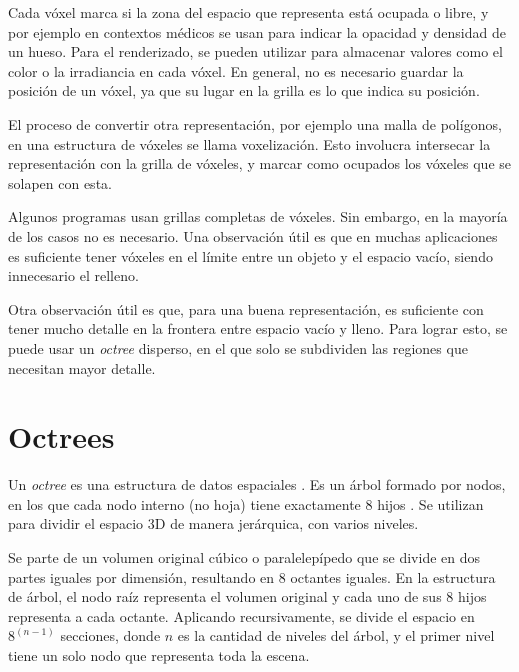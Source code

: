 

Cada vóxel marca si la zona del espacio que representa está ocupada o libre, y por ejemplo en contextos médicos se usan para indicar la opacidad y densidad de un hueso.
Para el renderizado, se pueden utilizar para almacenar valores como el color o la irradiancia en cada vóxel.
En general, no es necesario guardar la posición de un vóxel, ya que su lugar en la grilla es lo que indica su posición.

El proceso de convertir otra representación, por ejemplo una malla de polígonos, en una estructura de vóxeles se llama voxelización.
Esto involucra intersecar la representación con la grilla de vóxeles, y marcar como ocupados los vóxeles que se solapen con esta.

Algunos programas usan grillas completas de vóxeles.
Sin embargo, en la mayoría de los casos no es necesario.
Una observación útil es que en muchas aplicaciones es suficiente tener vóxeles en el límite entre un objeto y el espacio vacío, siendo innecesario el relleno.

Otra observación útil es que, para una buena representación, es suficiente con tener mucho detalle en la frontera entre espacio vacío y lleno.
Para lograr esto, se puede usar un \textit{octree} disperso, en el que solo se subdividen las regiones que necesitan mayor detalle.

\section{Octrees}\label{sec:octree}

Un \textit{octree} es una estructura de datos espaciales \cite{octree-textures}.
Es un árbol formado por nodos, en los que cada nodo interno (no hoja) tiene exactamente $8$ hijos \cite{rtr}.
Se utilizan para dividir el espacio 3D de manera jerárquica, con varios niveles.

Se parte de un volumen original cúbico o paralelepípedo que se divide en dos partes iguales por dimensión, resultando en $8$ octantes iguales.
En la estructura de árbol, el nodo raíz representa el volumen original y cada uno de sus $8$ hijos representa a cada octante.
Aplicando recursivamente, se divide el espacio en $8^{(n - 1)}$ secciones, donde $n$ es la cantidad de niveles del árbol, y el primer nivel tiene un solo nodo que representa toda la escena.

